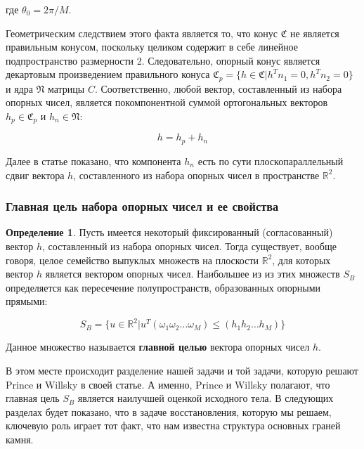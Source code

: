 \documentclass[a4paper, 12pt, titlepage]{article}
\theoremstyle{definition}
\newtheorem{SmartDefinition}{Определение}
\theoremstyle{plain}
\theoremstyle{plain}
\begin{document}
где $\theta_{0} = 2 \pi / M$.

Геометрическим следствием этого факта является то, что конус $\mathfrak{C}$ не
является правильным конусом, поскольку целиком содержит в себе линейное
подпространство размерности 2. Следовательно, опорный конус является декартовым
произведением правильного конуса
$\mathfrak{C}_{p} = \{h \in \mathfrak{C} | h^{T} n_{1} = 0, h^{T} n_{2} = 0\}$
и ядра $\mathfrak{N}$ матрицы $C$. Соответственно, любой вектор, составленный из
набора опорных чисел, является покомпонентной суммой ортогональных векторов
$h_{p} \in \mathfrak{C}_{p}$ и $h_{n} \in \mathfrak{N}$:

\begin{equation}
 h = h_{p} + h_{n}
\end{equation}

Далее в статье показано, что компонента $h_{n}$ есть по сути плоскопараллельный
сдвиг вектора $h$, составленного из набора опорных чисел в пространстве
$\mathbb{R}^{2}$.

\subsubsection{Главная цель набора опорных чисел и ее свойства}
\label{sec:history/PrinceW90/basic-object}

\begin{SmartDefinition}
 \label{def:basic-object}
 Пусть имеется некоторый фиксированный (согласованный) вектор $h$, составленный
 из набора опорных чисел. Тогда существует, вообще говоря, целое семейство
 выпуклых множеств на плоскости $\mathbb{R}^{2}$, для которых вектор $h$
 является вектором опорных чисел. Наибольшее из из этих множеств $S_{B}$ 
 определяется как пересечение полупространств, образованных опорными прямыми:

 \begin{equation}
 S_{B} = \{u \in \mathbb{R}^{2} |
 u^{T} (\omega_{1} \omega_{2} \ldots \omega_{M}) \leq
 (h_{1} h_{2} \ldots h_{M})\}
 \end{equation}

 Данное множество называется \textbf{главной целью} вектора опорных чисел $h$.
\end{SmartDefinition}

В этом месте происходит разделение нашей задачи и той задачи, которую решают
Prince и Willsky в своей статье. А именно, Prince и Willsky полагают, что
главная цель $S_{B}$ является наилучшей оценкой исходного тела. В следующих
разделах будет показано, что в задаче восстановления, которую мы решаем,
ключевую роль играет тот факт, что нам известна структура основных граней камня.
\end{document}
